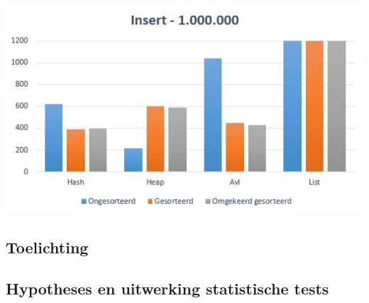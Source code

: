 \documentclass{article}
\begin{document}
\includegraphics{InsertGrafiek}
\subsection{Toelichting}
\subsection{Hypotheses en uitwerking statistische tests}
\end{document}
